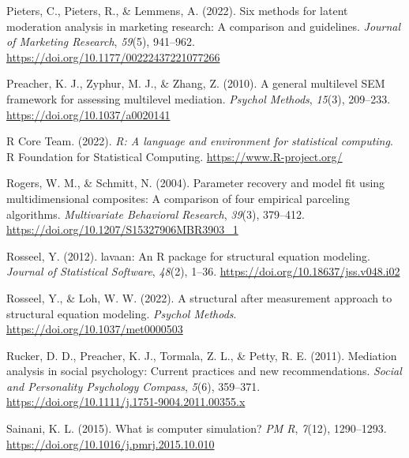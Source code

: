 \documentclass[
  11pt,
  man]{apa6}
\newlength{\cslhangindent}
\newlength{\cslentryspacingunit} %
\newenvironment{CSLReferences}[2] %
 {%
  \setlength{\parindent}{0pt}
  \ifodd #1
  \let\oldpar\par
  \def\par{\hangindent=\cslhangindent\oldpar}
  \fi
  \setlength{\parskip}{#2\cslentryspacingunit}
 }%
 {}
\begin{document}
\begin{CSLReferences}{1}{0}
\leavevmode{}%
Pieters, C., Pieters, R., \& Lemmens, A. (2022). Six {methods} for {latent moderation analysis} in {marketing research}: {A comparison} and {guidelines}. \emph{Journal of Marketing Research}, \emph{59}(5), 941--962. \url{https://doi.org/10.1177/00222437221077266}

\leavevmode{}%
Preacher, K. J., Zyphur, M. J., \& Zhang, Z. (2010). A general multilevel {SEM} framework for assessing multilevel mediation. \emph{Psychol Methods}, \emph{15}(3), 209--233. \url{https://doi.org/10.1037/a0020141}

\leavevmode{}%
R Core Team. (2022). \emph{R: A language and environment for statistical computing}. R Foundation for Statistical Computing. \url{https://www.R-project.org/}

\leavevmode{}%
Rogers, W. M., \& Schmitt, N. (2004). Parameter {recovery} and {model fit using multidimensional composites}: {A comparison} of {four empirical parceling algorithms}. \emph{Multivariate Behavioral Research}, \emph{39}(3), 379--412. \url{https://doi.org/10.1207/S15327906MBR3903_1}

\leavevmode{}%
Rosseel, Y. (2012). {lavaan}: An {R} package for structural equation modeling. \emph{Journal of Statistical Software}, \emph{48}(2), 1--36. \url{https://doi.org/10.18637/jss.v048.i02}

\leavevmode{}%
Rosseel, Y., \& Loh, W. W. (2022). A structural after measurement approach to structural equation modeling. \emph{Psychol Methods}. \url{https://doi.org/10.1037/met0000503}

\leavevmode{}%
Rucker, D. D., Preacher, K. J., Tormala, Z. L., \& Petty, R. E. (2011). Mediation {analysis} in {social psychology}: {Current practices} and {new recommendations}. \emph{Social and Personality Psychology Compass}, \emph{5}(6), 359--371. \url{https://doi.org/10.1111/j.1751-9004.2011.00355.x}

\leavevmode{}%
Sainani, K. L. (2015). What is {computer simulation}? \emph{PM R}, \emph{7}(12), 1290--1293. \url{https://doi.org/10.1016/j.pmrj.2015.10.010}


\end{CSLReferences}
\end{document}
